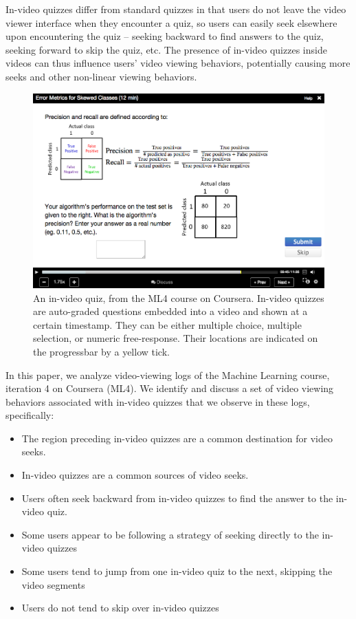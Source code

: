 \documentclass[letterpaper]{article}
\begin{document}
In-video quizzes differ from standard quizzes in that users do not leave the video viewer interface when they encounter a quiz, so users can easily seek elsewhere upon encountering the quiz -- seeking backward to find answers to the quiz, seeking forward to skip the quiz, etc.
The presence of in-video quizzes inside videos can thus influence users' video viewing behaviors, potentially causing more seeks and other non-linear viewing behaviors.

\begin{figure}
\includegraphics[width=1.0\columnwidth]{coursera}
\caption{An in-video quiz, from the ML4 course on Coursera. In-video quizzes are auto-graded questions embedded into a video and shown at a certain timestamp. They can be either multiple choice, multiple selection, or numeric free-response. Their locations are indicated on the progressbar by a yellow tick.}
\label{fig:coursera}
\end{figure}

In this paper, we analyze video-viewing logs of the Machine Learning course, iteration 4 on Coursera (ML4). We identify and discuss a set of video viewing behaviors associated with in-video quizzes that we observe in these logs, specifically:

\begin{itemize}
\item The region preceding in-video quizzes are a common destination for video seeks.
\item In-video quizzes are a common sources of video seeks.
\item Users often seek backward from in-video quizzes to find the answer to the in-video quiz.
\item Some users appear to be following a strategy of seeking directly to the in-video quizzes
\item Some users tend to jump from one in-video quiz to the next, skipping the video segments
\item Users do not tend to skip over in-video quizzes
\end{itemize}
\end{document}
